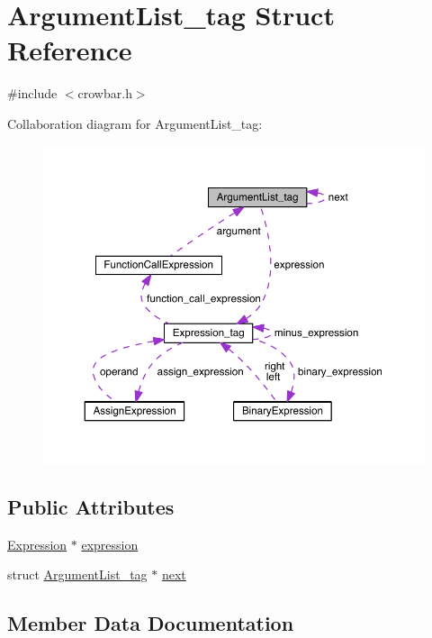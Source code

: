 \hypertarget{struct_argument_list__tag}{}\section{Argument\+List\+\_\+tag Struct Reference}
\label{struct_argument_list__tag}


{\ttfamily \#include $<$crowbar.\+h$>$}



Collaboration diagram for Argument\+List\+\_\+tag\+:\nopagebreak
\begin{figure}[H]
\begin{center}
\leavevmode
\includegraphics[width=350pt]{struct_argument_list__tag__coll__graph}
\end{center}
\end{figure}
\subsection*{Public Attributes}
\begin{DoxyCompactItemize}
\item 
\hyperlink{crowbar_8h_a070c6feb370aad8a9665ca315bf6ed4a}{Expression} $\ast$ \hyperlink{struct_argument_list__tag_a90b0642f2ea0053d4382053fe4fb397b}{expression}
\item 
struct \hyperlink{struct_argument_list__tag}{Argument\+List\+\_\+tag} $\ast$ \hyperlink{struct_argument_list__tag_adf51711dee3b1c443d0f75a92c0a8d6b}{next}
\end{DoxyCompactItemize}


\subsection{Member Data Documentation}
\hypertarget{struct_argument_list__tag_a90b0642f2ea0053d4382053fe4fb397b}{}
